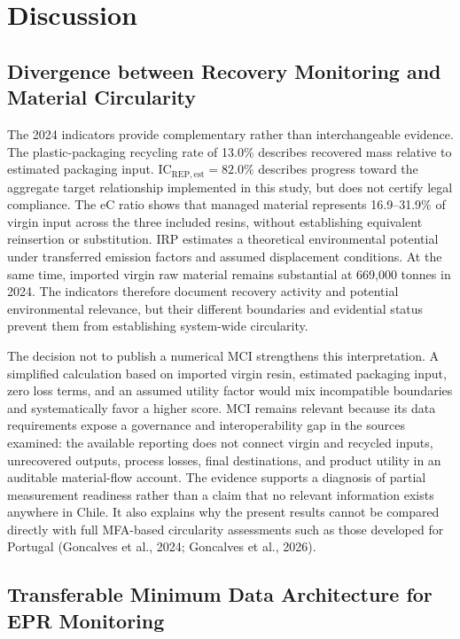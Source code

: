 \documentclass[review,10pt]{elsarticle}
\newcommand{\changepar}[1]{#1\par\medskip}
\begin{document}
\section{Discussion}
\subsection{Divergence between Recovery Monitoring and Material Circularity}

\changepar{The 2024 indicators provide complementary rather than interchangeable evidence. The plastic-packaging recycling rate of 13.0\% describes recovered mass relative to estimated packaging input. IC$_{\mathrm{REP,est}}=82.0\%$ describes progress toward the aggregate target relationship implemented in this study, but does not certify legal compliance. The eC ratio shows that managed material represents 16.9--31.9\% of virgin input across the three included resins, without establishing equivalent reinsertion or substitution. IRP estimates a theoretical environmental potential under transferred emission factors and assumed displacement conditions. At the same time, imported virgin raw material remains substantial at 669,000 tonnes in 2024. The indicators therefore document recovery activity and potential environmental relevance, but their different boundaries and evidential status prevent them from establishing system-wide circularity.}

\changepar{The decision not to publish a numerical MCI strengthens this interpretation. A simplified calculation based on imported virgin resin, estimated packaging input, zero loss terms, and an assumed utility factor would mix incompatible boundaries and systematically favor a higher score. MCI remains relevant because its data requirements expose a governance and interoperability gap in the sources examined: the available reporting does not connect virgin and recycled inputs, unrecovered outputs, process losses, final destinations, and product utility in an auditable material-flow account. The evidence supports a diagnosis of partial measurement readiness rather than a claim that no relevant information exists anywhere in Chile. It also explains why the present results cannot be compared directly with full MFA-based circularity assessments such as those developed for Portugal (Goncalves et al., 2024; Goncalves et al., 2026).}

\subsection{Transferable Minimum Data Architecture for EPR Monitoring}
\end{document}
